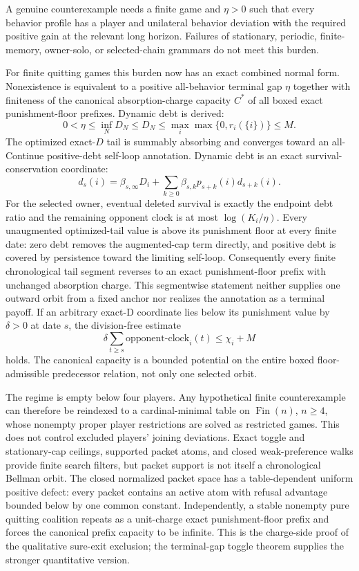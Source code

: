 \documentclass[11pt]{article}
\begin{document}
A genuine counterexample needs a finite game and \(\eta>0\) such that every
behavior profile has a player and unilateral behavior deviation with the
required positive gain at the relevant long horizon.  Failures of stationary,
periodic, finite-memory, owner-solo, or selected-chain grammars do not meet
this burden.

For finite quitting games this burden now has an exact combined normal form.
Nonexistence is equivalent to a positive all-behavior terminal gap \(\eta\)
together with finiteness of the canonical absorption-charge capacity \(C^*\)
of all boxed exact punishment-floor prefixes.  Dynamic debt is derived:
\[
 0<\eta\leq \inf_N D_N\leq D_N
 \leq \max_i\max\{0,r_i(\{i\})\}\leq M.
\]
The optimized exact-$D$ tail is summably absorbing and converges toward an
all-Continue positive-debt self-loop annotation.  Dynamic debt is an exact
survival-conservation coordinate:
\[
 d_s(i)=\beta_{s,\infty}D_i+
 \sum_{k\geq0}\beta_{s,k}p_{s+k}(i)d_{s+k}(i).
\]
For the selected owner, eventual deleted survival is exactly the endpoint
debt ratio and the remaining opponent clock is at most
\(\log(K_i/\eta)\).  Every unaugmented optimized-tail value is above its
punishment floor at every finite date: zero debt removes the augmented-cap
term directly, and positive debt is covered by persistence toward the limiting
self-loop.  Consequently every finite chronological tail segment reverses to
an exact punishment-floor prefix with unchanged absorption charge.  This
segmentwise statement neither supplies one outward orbit from a fixed anchor
nor realizes the annotation as a terminal payoff.  If an arbitrary exact-D
coordinate lies below
its punishment value by \(\delta>0\) at date \(s\), the division-free estimate
\[
 \delta\sum_{t\geq s}\text{opponent-clock}_i(t)\leq \chi_i+M
\]
holds.  The canonical capacity is a bounded potential on the entire boxed
floor-admissible predecessor relation, not only one selected orbit.

The regime is empty below four players.  Any hypothetical finite
counterexample can therefore be reindexed to a cardinal-minimal table on
\(\operatorname{Fin}(n)\), \(n\geq4\), whose nonempty proper player
restrictions are solved as restricted games.  This does not control excluded
players' joining deviations.  Exact toggle and stationary-cap ceilings,
supported packet atoms, and closed weak-preference walks provide finite search
filters, but packet support is not itself a chronological Bellman orbit.  The
closed normalized packet space has a table-dependent uniform positive defect:
every packet contains an active atom with refusal advantage bounded below by
one common constant.  Independently, a stable nonempty pure quitting coalition
repeats as a unit-charge exact punishment-floor prefix and forces the canonical
prefix capacity to be infinite.  This is the charge-side proof of the
qualitative sure-exit exclusion; the terminal-gap toggle theorem supplies the
stronger quantitative version.
\end{document}
